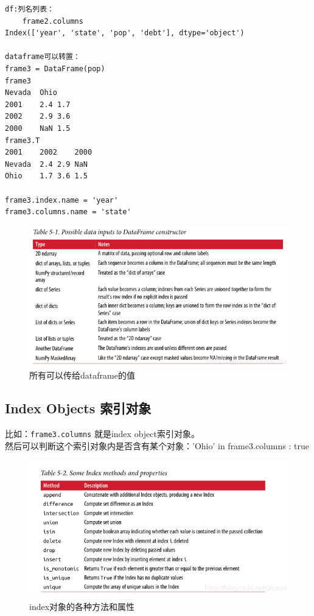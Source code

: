 \documentclass{article}
\begin{document}
\begin{lstlisting}
df:列名列表：
	frame2.columns
Index(['year', 'state', 'pop', 'debt'], dtype='object')

dataframe可以转置：
frame3 = DataFrame(pop)
frame3
Nevada	Ohio
2001	2.4	1.7
2002	2.9	3.6
2000	NaN	1.5
frame3.T
2001	2002	2000
Nevada	2.4	2.9	NaN
Ohio	1.7	3.6	1.5

frame3.index.name = 'year'
frame3.columns.name = 'state'
\end{lstlisting}
\begin{figure}[htpb]
	\centering
	\includegraphics[width=\linewidth]{fig/df1}
	\caption{所有可以传给dataframe的值}
\end{figure}

\subsection{Index Objects 索引对象}
比如：\lstinline|frame3.columns| 就是index object索引对象。\\
然后可以判断这个索引对象内是否含有某个对象：'Ohio' in frame3.columns : true

\begin{figure}[hpb]
	\centering
	\includegraphics[width=\linewidth]{fig/df2}
	\caption{index对象的各种方法和属性}
\end{figure}
\end{document}
